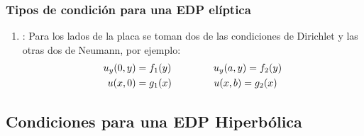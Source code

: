 \documentclass[12pt]{beamer}
\begin{document}
\begin{frame}
\frametitle{Tipos de condición para una EDP elíptica}
\begin{enumerate}[<+->]
\conti
\item {}: Para los lados de la placa se toman dos de las condiciones de Dirichlet y las otras dos de Neumann, por ejemplo:
\begin{align}
\begin{aligned}
u_{y} (0, y) &= f_{1} (y) \hspace{1.5cm} u_{y} (a, y) = f_{2} (y) \\
u (x, 0) &= g_{1} (x) \hspace{1.5cm} u (x, b) = g_{2} (x)
\end{aligned}
\label{eq:ecuacion_06_01_06}
\end{align}
\end{enumerate}
\end{frame}

\subsection{Condiciones para una EDP Hiperbólica}
\end{document}
